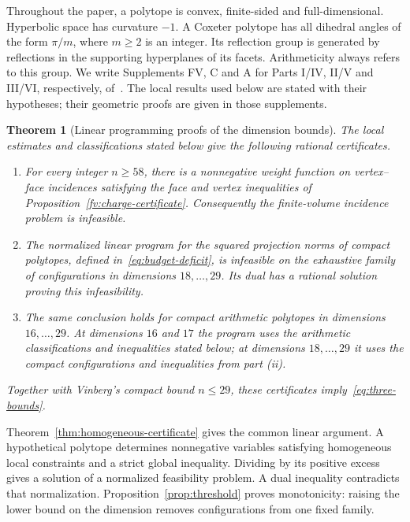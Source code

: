 \documentclass[11pt]{article}
\newtheorem{theorem}{Theorem}[section]
\theoremstyle{definition}
\theoremstyle{remark}
\numberwithin{equation}{section}
\begin{document}
Throughout the paper, a polytope is convex, finite-sided and
full-dimensional. Hyperbolic space has curvature $-1$. A Coxeter
polytope has all dihedral angles of the form $\pi/m$, where $m\ge2$
is an integer. Its reflection group is generated by reflections in
the supporting hyperplanes of its facets. Arithmeticity always refers
to this group. We write Supplements FV, C and A for Parts I/IV, II/V
and III/VI, respectively, of~\cite{BoundsSupplement}. The local
results used below are stated with their hypotheses; their geometric
proofs are given in those supplements.

\begin{theorem}[Linear programming proofs of the dimension bounds]
\label{thm:recovery}
The local estimates and classifications stated below give the following
rational certificates.
\begin{enumerate}[label=\textup{(\roman*)}]
\item For every integer $n\ge58$, there is a nonnegative weight
function on vertex--face incidences satisfying the face and vertex
inequalities of Proposition~\ref{fv:charge-certificate}.
Consequently the finite-volume incidence problem is infeasible.
\item The normalized linear program for the squared projection norms
of compact polytopes, defined in~\eqref{eq:budget-deficit}, is
infeasible on the exhaustive family of configurations in dimensions
$18,\ldots,29$. Its dual has a rational solution proving this
infeasibility.
\item The same conclusion holds for compact arithmetic polytopes in
dimensions $16,\ldots,29$. At dimensions $16$ and $17$ the program
uses the arithmetic classifications and inequalities stated below;
at dimensions $18,\ldots,29$ it uses the compact configurations
and inequalities from part \textup{(ii)}.
\end{enumerate}
Together with Vinberg's compact bound $n\le29$, these certificates
imply~\eqref{eq:three-bounds}.
\end{theorem}

Theorem~\ref{thm:homogeneous-certificate} gives the common linear
argument. A hypothetical polytope determines nonnegative variables
satisfying homogeneous local constraints and a strict global
inequality. Dividing by its positive excess gives a solution of a
normalized feasibility problem. A dual inequality contradicts that
normalization. Proposition~\ref{prop:threshold} proves monotonicity:
raising the lower bound on the dimension removes configurations
from one fixed family.
\end{document}
